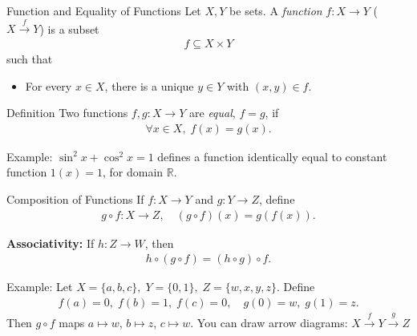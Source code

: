 \begin{frame}{Function and Equality of Functions}
Let \(X, Y\) be sets. A \emph{function} \(f: X \to Y\) ($X \xrightarrow{f} Y$) is a subset
\begin{align*}
f \subseteq X \times Y
\end{align*}
such that
\begin{itemize}
  \item For every \(x \in X\), there is a unique \(y \in Y\) with \((x,y) \in f\).
\end{itemize}

\medskip
\begin{block}{Definition}
Two functions \(f, g: X \to Y\) are \emph{equal}, \(f = g\), if
\begin{align*}
\forall x \in X,\; f(x) = g(x).
\end{align*}
\end{block}
\vspace{-0.5cm}

\begin{block}{Example:} \(\sin^2 x + \cos^2 x = 1\) defines a function identically equal to constant function \(1(x)=1\), for domain \(\mathbb{R}\).
\end{block}
\end{frame}



\begin{frame}{Composition of Functions}
If \(f: X \to Y\) and \(g: Y \to Z\), define
\begin{align*}
g \circ f: X \to Z, \quad (g \circ f)(x) = g(f(x)).
\end{align*}

\medskip

\textbf{Associativity:} If \(h: Z \to W\), then
\begin{align*}
h \circ (g \circ f) = (h \circ g) \circ f.
\end{align*}
\vspace{-0.5cm}
\begin{block}{Example:}
Let  $X = \{a,b,c\},\; Y = \{0,1\},\; Z = \{w,x,y,z\}.$ Define
\begin{align*}
f(a)=0,\; f(b)=1,\; f(c)=0, \quad
g(0)=w,\; g(1)=z.
\end{align*}
Then \(g \circ f\) maps \(a\mapsto w\), \(b\mapsto z\), \(c\mapsto w\).
You can draw arrow diagrams:
$X \xrightarrow{f} Y \xrightarrow{g} Z$
\end{block}
\end{frame}



